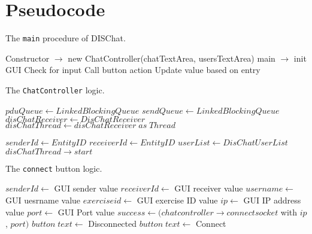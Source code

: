 \documentclass[12pt]{article}
\begin{document}
\section{Pseudocode}

\begin{algorithm}
  \caption{The \texttt{main} procedure of DISChat.}\label{alg:chatgui}
  \begin{algorithmic}[1]
    \State Constructor $\to$ new ChatController(chatTextArea, usersTextArea)
    \State main $\to$ init GUI
    \Loop
    \State Check for input
    \State Call button action
    \State Update value based on entry
    \EndIf
    \EndLoop
    \EndProcedure
  \end{algorithmic}
\end{algorithm}

\begin{algorithm}
  \caption{The \texttt{ChatController} logic.}\label{alg:chatcontroller}
  \begin{algorithmic}[1]
    \State $pduQueue \gets LinkedBlockingQueue$
    \State $sendQueue \gets LinkedBlockingQueue$
    \State $disChatReceiver \gets DisChatReceiver$
    \State $disChatThread \gets disChatReceiver\; as\; Thread$
   
    \State $senderId \gets EntityID$
    \State $receiverId  \gets EntityID$
    \State $userList \gets DisChatUserList$
    \State $disChatThread \to start$
    \EndProcedure
  \end{algorithmic}
\end{algorithm}

\begin{algorithm}
  \caption{The \texttt{connect} button logic.}\label{alg:connectbutton}
  \begin{algorithmic}[1]
    \State $senderId \gets$ GUI sender value
    \State $receiverId \gets$ GUI receiver value
    \State $username \gets$ GUI uesrname value
    \State $exerciseid \gets$ GUI exercise ID value
    \State $ip \gets$ GUI IP address value
    \State $port \gets$ GUI Port value
      \State $success \gets (chatcontroller \to connectsocket$ with $ip$, $port)$
        \State $button\; text \gets $ Disconnected
      \Else
        \State $button\; text \gets $ Connect 
      \EndIf
    \EndIf
    \EndProcedure
  \end{algorithmic}
\end{algorithm}
\end{document}
